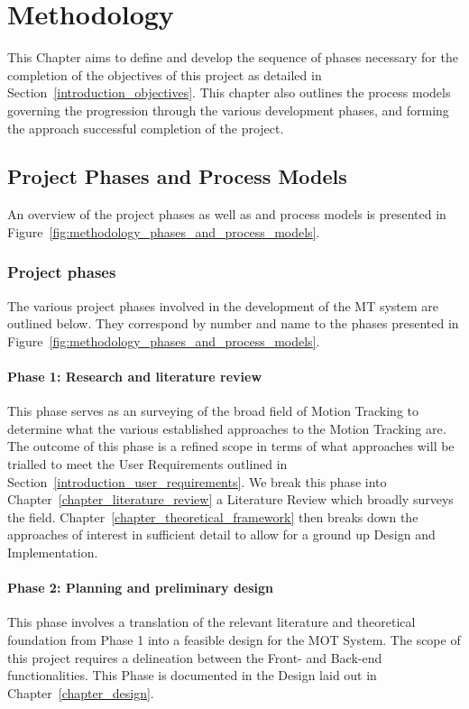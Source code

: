 \chapter{Methodology}\label{chapter_methodology}
This Chapter aims to define and develop the sequence of phases necessary for the completion
of the objectives of this project as detailed in
Section~\ref{introduction_objectives}. This chapter also outlines the process
models governing the progression through the various development phases, and
forming the approach successful completion of the project.

\section{Project Phases and Process Models }
An overview of the project phases as well as and process models is presented in
Figure~\ref{fig:methodology_phases_and_process_models}.

\subsection{Project phases}
The various project phases involved in the development of the MT system are
outlined below. They correspond by number and name to the phases presented in
Figure~\ref{fig:methodology_phases_and_process_models}.

\subsubsection{Phase 1: Research and literature review}
This phase serves as an surveying of the broad field of Motion Tracking to
determine what the various established approaches to the Motion Tracking are.
The outcome of this phase is a refined scope in terms of what approaches will be
trialled to meet the User Requirements outlined in
Section~\ref{introduction_user_requirements}. We break this phase into
Chapter~\ref{chapter_literature_review} a Literature Review which broadly
surveys the field. Chapter~\ref{chapter_theoretical_framework} then breaks down
the approaches of interest in sufficient detail to allow for a ground up Design
and Implementation.

\subsubsection{Phase 2: Planning and preliminary design}
This phase involves a translation of the relevant literature and theoretical
foundation from Phase 1 into a feasible design for the MOT System. The scope of
this project requires a delineation between the Front- and Back-end
functionalities. This Phase is documented in the Design laid out in
Chapter~\ref{chapter_design}.

